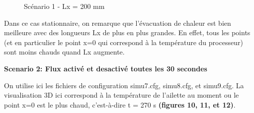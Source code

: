 \documentclass[11pt]{article} %
\begin{document}
\begin{figure}[!htb]
				\centering
				\qquad
				\caption{Scénario 1 - Lx = 200 mm}%
			\end{figure}
\par Dans ce cas stationnaire, on remarque que l’évacuation de chaleur est bien meilleure avec des longueurs Lx de plus en plus grandes. En effet, tous les points (et en particulier le point x=0 qui correspond à la température du processeur) sont moins chauds quand Lx augmente.
	
		\begin{center}
			\textbf{Scenario 2: Flux activé et desactivé toutes les 30 secondes}
		\end{center}
\par On utilise ici les fichiers de configuration simu\textunderscore7.cfg, simu\textunderscore8.cfg, et simu\textunderscore9.cfg. La visualisation 3D ici correspond à la température de l’ailette au moment ou le point x=0 est le plus chaud, c’est-à-dire t = 270 s \textbf{(figures 10, 11, et 12)}.
			
\end{document}
